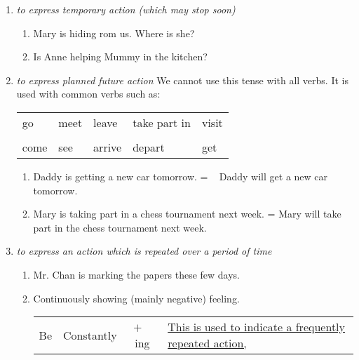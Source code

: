 \begin{enumerate}
    \item {\it to express temporary action (which may stop soon)}
        \begin{enumerate}
            \item Mary is hiding rom us. Where is she?
            \item Is Anne helping Mummy in the kitchen?
        \end{enumerate}
    \item {\it to express planned future action}
        \newline
        We cannot use this tense with all verbs.
        It is used with common verbs such as:
        \begin{center}
        \begin{tabular}{lllll}
            go & meet & leave & take part in & visit \\
            & & & & \\
            come & see & arrive & depart & get
        \end{tabular}
        \end{center}
        \begin{enumerate}
            \item Daddy is getting a new car tomorrow.
                \newline
                = ~ Daddy will get a new car tomorrow.
            \item Mary is taking part in a chess tournament next week.
                \newline
                = Mary will take part in the chess tournament next week.
        \end{enumerate}
    \item {\it to express an action which is repeated over a period of time}
        \begin{enumerate}
            \item Mr. Chan is marking the papers these few days.
                \newline
            \item Continuously showing (mainly negative) feeling.
                \newline
                \begin{tabular}{cccl}
                    \multirow{3}{*}{Be}
                    & Constantly
                    & \multirow{3}{*}{$+$ ~ ing}
                    & \underline{This is used to indicate a frequently repeated action,}\\

\end{tabular}
\end{enumerate}
\end{enumerate}
